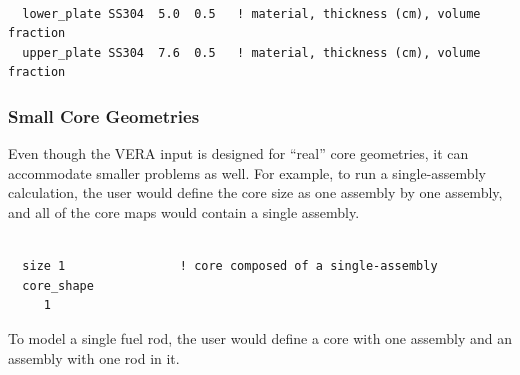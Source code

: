 \begin{Verbatim}[fontsize=\small]

  lower_plate SS304  5.0  0.5   ! material, thickness (cm), volume fraction
  upper_plate SS304  7.6  0.5   ! material, thickness (cm), volume fraction
\end{Verbatim}

\subsubsection{Small Core Geometries}
\label{sec:smallcoregeom}

Even though the VERA input is designed for ``real'' core geometries, it can accommodate smaller
problems as well.
For example, to run a single-assembly calculation, the user would define the core size
as one assembly by one assembly, and all of the core maps would contain a single assembly.
\begin{Verbatim}[fontsize=\small]

  size 1                ! core composed of a single-assembly
  core_shape
     1

\end{Verbatim}

To model a single fuel rod, the user would define a core with one assembly and
an assembly with one rod in it.

